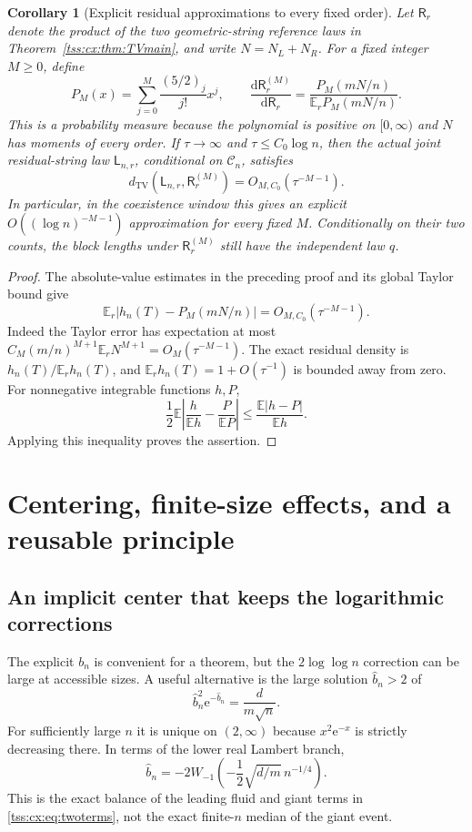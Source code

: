 \documentclass[11pt]{article}
\newtheorem{corollary}[theorem]{Corollary}
\theoremstyle{remark}\newtheorem{remark}[theorem]{Remark}
\theoremstyle{definition}\newtheorem{definition}[theorem]{Definition}
\newcommand{\dd}{\mathrm d}
\newcommand{\e}{\mathrm e}
\newcommand{\E}{\mathbb E}
\newcommand{\TV}{d_{\mathrm{TV}}}
\newcommand{\Cev}{\mathcal C_n}
\begin{document}
\begin{corollary}[Explicit residual approximations to every fixed order]
\label{tss:cx:cor:density}
Let $\mathsf R_r$ denote the product of the two geometric-string
reference laws in Theorem~\ref{tss:cx:thm:TVmain}, and write $N=N_L+N_R$.
For a fixed integer $M\ge0$, define
\[
 P_M(x)=\sum_{j=0}^{M}\frac{(5/2)_j}{j!}x^j,\qquad
 \frac{\dd\mathsf R_r^{(M)}}{\dd\mathsf R_r}
   =\frac{P_M(mN/n)}{\E_r P_M(mN/n)}.
\]
This is a probability measure because the polynomial is positive
on $[0,\infty)$ and $N$ has moments of every order. If
$\tau\to\infty$ and $\tau\le C_0\log n$, then the actual joint
residual-string law $\mathsf L_{n,r}$, conditional on $\Cev$, satisfies
\[
 \TV(\mathsf L_{n,r},\mathsf R_r^{(M)})
       =O_{M,C_0}(\tau^{-M-1}).
\]
In particular, in the coexistence window this gives an explicit
$O((\log n)^{-M-1})$ approximation for every fixed $M$.
Conditionally on their two counts, the block lengths under
$\mathsf R_r^{(M)}$ still have the independent law $q$.
\end{corollary}
\begin{proof}
The absolute-value estimates in the preceding proof and its global
Taylor bound give
\[
 \E_r|h_n(T)-P_M(mN/n)|=O_{M,C_0}(\tau^{-M-1}).
\]
Indeed the Taylor error has expectation at most
$C_M(m/n)^{M+1}\E_rN^{M+1}=O_M(\tau^{-M-1})$.
The exact residual density is $h_n(T)/\E_rh_n(T)$, and
$\E_rh_n(T)=1+O(\tau^{-1})$ is bounded away from zero.
For nonnegative integrable functions $h,P$,
\[
 \frac12\E\left|\frac h{\E h}-\frac P{\E P}\right|
       \le\frac{\E|h-P|}{\E h}.
\]
Applying this inequality proves the assertion.
\end{proof}

\section{Centering, finite-size effects, and a reusable principle}
\label{tss:cx:sec:center}

\subsection{An implicit center that keeps the logarithmic corrections}
The explicit $b_n$ is convenient for a theorem, but the
$2\log\log n$ correction can be large at accessible sizes. A useful
alternative is the large solution $\widehat b_n>2$ of
\begin{equation}\label{tss:cx:eq:exactbalance}
 \widehat b_n^2\e^{-\widehat b_n}
       =\frac{d}{m\sqrt n}.
\end{equation}
For sufficiently large $n$ it is unique on $(2,\infty)$ because
$x^2\e^{-x}$ is strictly decreasing there. In terms of the lower
real Lambert branch,
\begin{equation}\label{tss:cx:eq:Wcenter}
 \widehat b_n=-2W_{-1}\left(-\frac12\sqrt{d/m}\,n^{-1/4}\right).
\end{equation}
This is the exact balance of the leading fluid and giant terms in
\eqref{tss:cx:eq:twoterms}, not the exact finite-$n$ median of the giant
event.
\end{document}
